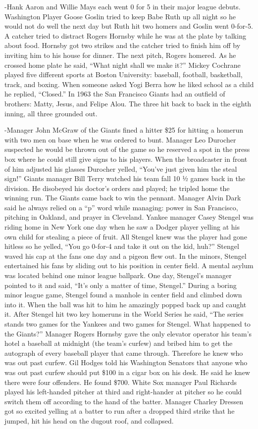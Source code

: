 \documentclass[
]{article}
\begin{document}
-Hank Aaron and Willie Mays each went 0 for 5 in their major league
debuts. Washington Player Goose Goslin tried to keep Babe Ruth up all
night so he would not do well the next day but Ruth hit two homers and
Goslin went 0-for-5. A catcher tried to distract Rogers Hornsby while he
was at the plate by talking about food. Hornsby got two strikes and the
catcher tried to finish him off by inviting him to his house for dinner.
The next pitch, Rogers homered. As he crossed home plate he said, ``What
night shall we make it?'' Mickey Cochrane played five different sports
at Boston University: baseball, football, basketball, track, and boxing.
When someone asked Yogi Berra how he liked school as a child he replied,
``Closed.'' In 1963 the San Francisco Giants had an outfield of
brothers: Matty, Jesus, and Felipe Alou. The three hit back to back in
the eighth inning, all three grounded out.

-Manager John McGraw of the Giants fined a hitter \$25 for hitting a
homerun with two men on base when he was ordered to bunt. Manager Leo
Durocher suspected he would be thrown out of the game so he reserved a
spot in the press box where he could still give signs to his players.
When the broadcaster in front of him adjusted his glasses Durocher
yelled, ``You've just given him the steal sign!'' Giants manager Bill
Terry watched his team fall 10 ½ games back in the division. He
disobeyed his doctor's orders and played; he tripled home the winning
run. The Giants came back to win the pennant. Manager Alvin Dark said he
always relied on a ``p'' word while managing: power in San Francisco,
pitching in Oakland, and prayer in Cleveland. Yankee manager Casey
Stengel was riding home in New York one day when he saw a Dodger player
yelling at his own child for stealing a piece of fruit. All Stengel knew
was the player had gone hitless so he yelled, ``You go 0-for-4 and take
it out on the kid, huh?'' Stengel waved his cap at the fans one day and
a pigeon flew out. In the minors, Stengel entertained his fans by
sliding out to his position in center field. A mental asylum was located
behind one minor league ballpark. One day, Stengel's manager pointed to
it and said, ``It's only a matter of time, Stengel.'' During a boring
minor league game, Stengel found a manhole in center field and climbed
down into it. When the ball was hit to him he amazingly popped back up
and caught it. After Stengel hit two key homeruns in the World Series he
said, ``The series stands two games for the Yankees and two games for
Stengel. What happened to the Giants?'' Manager Rogers Hornsby gave the
only elevator operator his team's hotel a baseball at midnight (the
team's curfew) and bribed him to get the autograph of every baseball
player that came through. Therefore he knew who was out past curfew. Gil
Hodges told his Washington Senators that anyone who was out past curfew
should put \$100 in a cigar box on his desk. He said he knew there were
four offenders. He found \$700. White Sox manager Paul Richards played
his left-handed pitcher at third and right-hander at pitcher so he could
switch them off according to the hand of the batter. Manager Charley
Dressen got so excited yelling at a batter to run after a dropped third
strike that he jumped, hit his head on the dugout roof, and collapsed.
\end{document}
